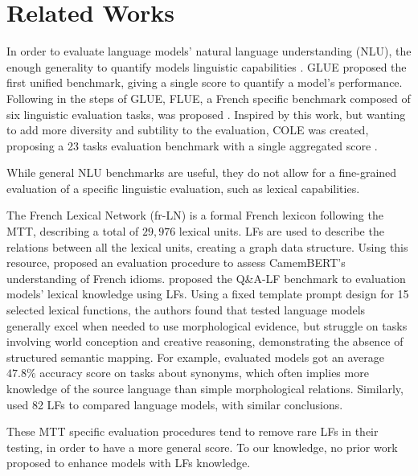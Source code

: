 \documentclass[11pt]{article}
\begin{document}
\section{Related Works}\label{sec:relwork}
In order to evaluate language models' natural language understanding (NLU), the
enough generality to quantify models linguistic capabilities
\citep{niSurveyLargeLanguage2025}. GLUE \cite{niSurveyLargeLanguage2025}
proposed the first unified benchmark, giving a single score to quantify a
model's performance. Following in the steps of GLUE,
FLUE, a French specific benchmark composed of six linguistic evaluation tasks,
was proposed \citep{leFlauBERTUnsupervisedLanguage2020}. Inspired by this work,
but wanting to add more diversity and subtility to the evaluation, COLE was
created, proposing a 23 tasks evaluation benchmark with a single aggregated
score \citep{beaucheminCOLEComprehensiveBenchmark2025}. 

While general NLU benchmarks are useful, they do not allow for a fine-grained
evaluation of a specific linguistic evaluation, such as lexical capabilities.

The French Lexical Network (fr-LN) \citep{11403/lexical-system-fr/v3.2} is a
formal French lexicon following the MTT, describing a total of $29,976$ lexical
units. LFs are used to describe the relations between all the lexical units,
creating a graph data structure. Using this resource,
\citet{liuAssessingBERTsSensitivity2024} proposed 
an evaluation procedure to assess CamemBERT's \cite{martin-etal-2020-camembert}
understanding of French idioms. \citet{petrovQALFFrenchQuestionAnswering2025}
proposed the Q\&A-LF benchmark to evaluation models' lexical knowledge using
LFs. Using a fixed template prompt design for 15 selected lexical functions,
the authors found that tested language models generally excel when needed to use
morphological evidence, but struggle on tasks involving world conception and
creative reasoning, demonstrating the absence of structured semantic
mapping. For example, evaluated models got an average $47.8\%$ accuracy score
on 
tasks about synonyms, which often implies more knowledge of the source language
than simple morphological relations. Similarly, \citet{liEvaluationCompetenceLexicale2025}
used 82 LFs to 
compared language models, with similar conclusions.

These MTT specific evaluation procedures tend to remove rare LFs in their
testing, in order to have a more general score. To our knowledge, no prior work
proposed to enhance models with LFs knowledge.
\end{document}
